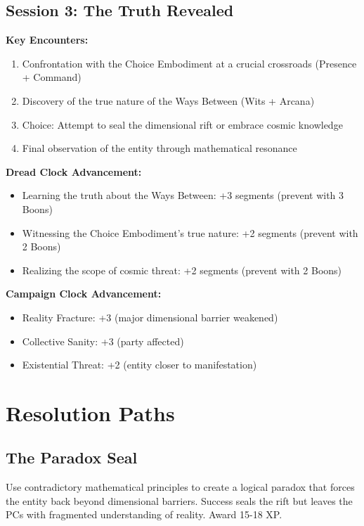 \documentclass[11pt]{article}
\begin{document}
\subsection{Session 3: The Truth Revealed}

\textbf{Key Encounters:}
\begin{enumerate}
\item Confrontation with the Choice Embodiment at a crucial crossroads (Presence + Command)
\item Discovery of the true nature of the Ways Between (Wits + Arcana)
\item Choice: Attempt to seal the dimensional rift or embrace cosmic knowledge
\item Final observation of the entity through mathematical resonance
\end{enumerate}

\textbf{Dread Clock Advancement:}
\begin{itemize}
\item Learning the truth about the Ways Between: +3 segments (prevent with 3 Boons)
\item Witnessing the Choice Embodiment's true nature: +2 segments (prevent with 2 Boons)
\item Realizing the scope of cosmic threat: +2 segments (prevent with 2 Boons)
\end{itemize}

\textbf{Campaign Clock Advancement:}
\begin{itemize}
\item Reality Fracture: +3 (major dimensional barrier weakened)
\item Collective Sanity: +3 (party affected)
\item Existential Threat: +2 (entity closer to manifestation)
\end{itemize}

\section{Resolution Paths}

\subsection{The Paradox Seal}

Use contradictory mathematical principles to create a logical paradox that forces the entity back beyond dimensional barriers. Success seals the rift but leaves the PCs with fragmented understanding of reality. Award 15-18 XP.
\end{document}
